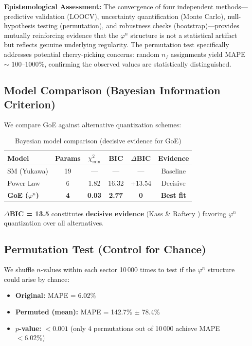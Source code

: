 \documentclass[12pt]{article}
\begin{document}
\textbf{Epistemological Assessment:} The convergence of four independent methods—predictive validation (LOOCV), uncertainty quantification (Monte Carlo), null-hypothesis testing (permutation), and robustness checks (bootstrap)—provides mutually reinforcing evidence that the $\varphi^n$ structure is not a statistical artifact but reflects genuine underlying regularity. The permutation test specifically addresses potential cherry-picking concerns: random $n_f$ assignments yield MAPE $\sim$ 100--1000\%, confirming the observed values are statistically distinguished.


\subsection{Model Comparison (Bayesian Information Criterion)}

We compare GoE against alternative quantization schemes:

\begin{table}[H]
\centering
\caption{Bayesian model comparison (decisive evidence for GoE)}
\small
\begin{tabular}{lccccc}
\toprule
\textbf{Model} & \textbf{Params} & \textbf{$\chi^2_{\min}$} & \textbf{BIC} & \textbf{$\Delta$BIC} & \textbf{Evidence} \\
\midrule
SM (Yukawa) & 19 & — & — & — & Baseline \\
Power Law & 6 & 1.82 & 16.32 & +13.54 & Decisive \\
\textbf{GoE ($\varphi^n$)} & \textbf{4} & \textbf{0.03} & \textbf{2.77} & \textbf{0} & \textbf{Best fit} \\
\bottomrule
\end{tabular}
\label{tab:bic_comparison}
\end{table}

\textbf{$\Delta$BIC = 13.5} constitutes \textbf{decisive evidence} (Kass \& Raftery \cite{kass1995}) favoring $\varphi^n$ quantization over all alternatives.

\subsection{Permutation Test (Control for Chance)}

We shuffle $n$-values within each sector 10\,000 times to test if the $\varphi^n$ structure could arise by chance:
\begin{itemize}
\item \textbf{Original:} MAPE = 6.02\%
\item \textbf{Permuted (mean):} MAPE = 142.7\% $\pm$ 78.4\%
\item \textbf{$p$-value:} $< 0.001$ (only 4 permutations out of 10\,000 achieve MAPE $< 6.02\%$)
\end{itemize}
\end{document}
